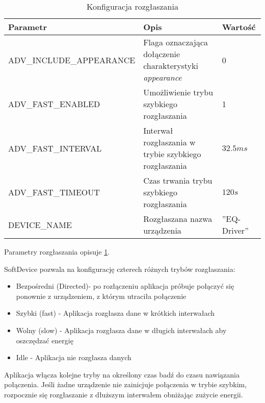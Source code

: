 \begin{table}[t]

\begin{tabularx}{\linewidth}{|l|X|l|}

\hline Parametr & Opis & Wartość \\

\hline ADV\_INCLUDE\_APPEARANCE & Flaga oznaczająca dołączenie charakterystyki
\emph{appearance} & 0 \\

\hline ADV\_FAST\_ENABLED & Umożliwienie trybu szybkiego rozgłaszania & 1 \\

\hline ADV\_FAST\_INTERVAL & Interwał rozgłaszania w trybie szybkiego
rozgłaszania & $32.5ms$ \\

\hline ADV\_FAST\_TIMEOUT & Czas trwania trybu szybkiego rozgłaszania & $120s$
\\

\hline DEVICE\_NAME & Rozgłaszana nazwa urządzenia & ''EQ-Driver'' \\

\hline \end{tabularx}

\caption{Konfiguracja rozgłaszania}

\label{tab:parametry-rozglaszania}

\end{table}

Parametry rozgłaszania opisuje \ref{tab:parametry-rozglaszania}.

SoftDevice pozwala na konfigurację czterech różnych trybów rozgłaszania:

\begin{itemize}

\item Bezpośredni (Directed)- po rozłączeniu aplikacja próbuje połączyć się
ponownie z urządzeniem, z którym utraciła połączenie

\item Szybki (fast) - Aplikacja rozgłasza dane w krótkich interwałach

\item Wolny (slow) - Aplikacja rozgłasza dane w długich interwałach aby
oszczędzać energię

\item Idle - Aplikacja nie rozgłasza danych

\end{itemize}

Aplikacja włącza kolejne tryby na określony czas badź do czasu nawiązania
połączenia. Jeśli żadne urządzenie nie zainicjuje połączenia w trybie szybkim,
rozpocznie się rozgłaszanie z dłuższym interwałem obniżając zużycie energii.

